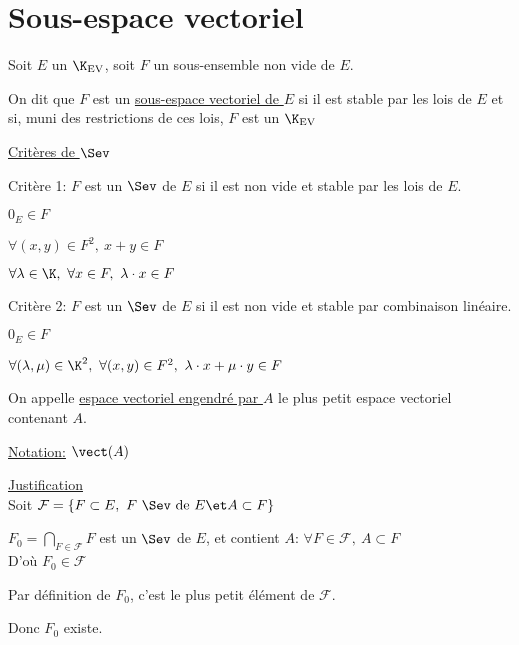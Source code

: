 \documentclass[12pt,twoside,a4paper]{article}
\begin{document}
	\section{Sous-espace vectoriel}
		Soit $E$ un $\K_\text{EV}$, soit $F$ un sous-ensemble non vide de $E$.
		\begin{defi}
			On dit que $F$ est un \underline{sous-espace vectoriel de $E$} si il est stable par les lois de $E$ et si, muni des restrictions de ces lois, $F$ est un $\K_\text{EV}$
		\end{defi}
		\begin{flushleft}
			\underline{Crit\`eres de $\Sev$}
			\begin{liste}
				\item Crit\`ere 1: $F$ est un $\Sev$ de $E$ si il est non vide et stable par les lois de $E$.
				\begin{liste}
					\item $0_E\in F$
					\item $\forall(x,y)\in F^{2},\ x+y\in F$
					\item $\forall \lambda\in\K,\ \forall x\in F,\ \lambda\cdot x\in F$
				\end{liste}
				\item Crit\`ere 2: $F$ est un $\Sev$ de $E$ si il est non vide et stable par combinaison lin\'eaire.
				\begin{liste}
					\item $0_E\in F$
					\item $\forall (\lambda,\mu)\in\K^{2},\ \forall (x,y)\in F^{2},\ \lambda\cdot x+\mu\cdot y\in F$
				\end{liste}
			\end{liste}
		\end{flushleft}
		\begin{defi}
			On appelle \underline{espace vectoriel engendr\'e par $A$} le plus petit espace vectoriel contenant $A$.
		\end{defi}
		\begin{flushleft}
			\underline{Notation:} $\vect(A)$
		\end{flushleft}
		\begin{flushleft}
			\underline{Justification}\\
			Soit $\mathcal{F}=\left\lbrace F\subset E,\ F\ \Sev\text{ de }E\et A\subset F\right\rbrace $
			\begin{liste}
				\item $F_0=\bigcap\limits_{F\in\mathcal{F}}F$ est un $\Sev$ de $E$, et contient $A$: $\forall F\in\mathcal{F},\ A\subset F$\\
					D'o\`u $F_0\in\mathcal{F}$
				\item Par d\'efinition de $F_0$, c'est le plus petit \'el\'ement de $\mathcal{F}$.
			\end{liste}
			Donc $F_0$ existe.
		\end{flushleft}
\end{document}
